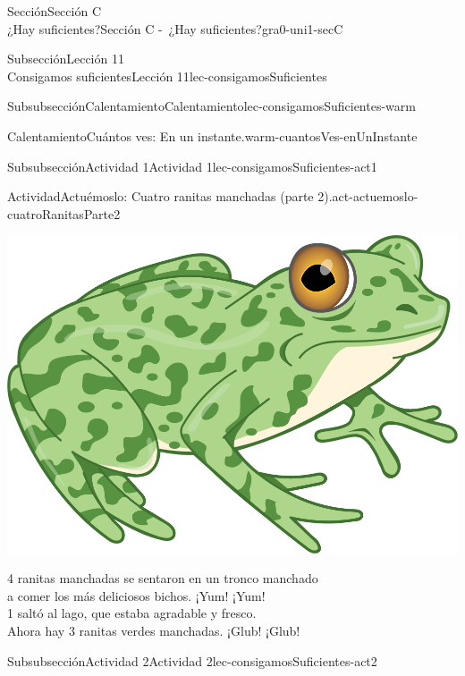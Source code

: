 \begin{sectionptx}{Sección}{{\Large Sección C\\}¿Hay suficientes?}{}{Sección C -~¿Hay suficientes?}{}{}{gra0-uni1-secC}
\begin{subsectionptx}{Subsección}{{\normalsize Lección 11\\[-0.05cm]}Consigamos suficientes}{}{Lección 11}{}{}{lec-consigamosSuficientes}
\begin{subsubsectionptx}{Subsubsección}{Calentamiento}{}{Calentamiento}{}{}{lec-consigamosSuficientes-warm}
\begin{exploration}{Calentamiento}{Cuántos ves: En un instante.}{warm-cuantosVes-enUnInstante}
\begin{sidebyside}{2}{0}{0}{0}
\begin{sbspanel}{0.5}
\end{sbspanel}%
\end{sidebyside}%
\end{exploration}%
\end{subsubsectionptx}
%
%
\typeout{************************************************}
\typeout{************************************************}
%
\clearpage
\begin{subsubsectionptx}{Subsubsección}{Actividad 1}{}{Actividad 1}{}{}{lec-consigamosSuficientes-act1}
\begin{activity}{Actividad}{Actuémoslo: Cuatro ranitas manchadas (parte 2).}{act-actuemoslo-cuatroRanitasParte2}%
\begin{image}{0.275}{0.45}{0.275}{}%
\includegraphics[max width=\linewidth, center]{external/png-source/RANA-VERDE.png}
\end{image}%
%
\par
\small
4 ranitas manchadas se sentaron en un tronco manchado\\
 a comer los más deliciosos bichos. ¡Yum! ¡Yum!\\
 1 saltó al lago, que estaba agradable y fresco.\\
 Ahora hay 3 ranitas verdes manchadas. ¡Glub! ¡Glub!%
\end{activity}%
\end{subsubsectionptx}
%
%
\typeout{************************************************}
\typeout{************************************************}
%
\begin{subsubsectionptx}{Subsubsección}{Actividad 2}{}{Actividad 2}{}{}{lec-consigamosSuficientes-act2}

\end{subsubsectionptx}
\end{subsectionptx}
\end{sectionptx}
